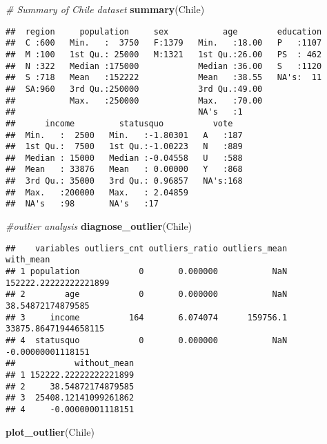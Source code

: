 \documentclass[]{article}
\newenvironment{Shaded}{\begin{snugshade}}{\end{snugshade}}
\newcommand{\CommentTok}[1]{\textcolor[rgb]{0.56,0.35,0.01}{\textit{#1}}}
\newcommand{\KeywordTok}[1]{\textcolor[rgb]{0.13,0.29,0.53}{\textbf{#1}}}
\newcommand{\NormalTok}[1]{#1}
\begin{document}
\begin{Shaded}
\begin{Highlighting}[]
\CommentTok{# Summary of Chile dataset}
\KeywordTok{summary}\NormalTok{(Chile)}
\end{Highlighting}
\end{Shaded}

\begin{verbatim}
##  region     population     sex           age        education  
##  C :600   Min.   :  3750   F:1379   Min.   :18.00   P   :1107  
##  M :100   1st Qu.: 25000   M:1321   1st Qu.:26.00   PS  : 462  
##  N :322   Median :175000            Median :36.00   S   :1120  
##  S :718   Mean   :152222            Mean   :38.55   NA's:  11  
##  SA:960   3rd Qu.:250000            3rd Qu.:49.00              
##           Max.   :250000            Max.   :70.00              
##                                     NA's   :1                  
##      income         statusquo          vote    
##  Min.   :  2500   Min.   :-1.80301   A   :187  
##  1st Qu.:  7500   1st Qu.:-1.00223   N   :889  
##  Median : 15000   Median :-0.04558   U   :588  
##  Mean   : 33876   Mean   : 0.00000   Y   :868  
##  3rd Qu.: 35000   3rd Qu.: 0.96857   NA's:168  
##  Max.   :200000   Max.   : 2.04859             
##  NA's   :98       NA's   :17
\end{verbatim}

\begin{Shaded}
\begin{Highlighting}[]
\CommentTok{#outlier analysis}
\KeywordTok{diagnose_outlier}\NormalTok{(Chile)}
\end{Highlighting}
\end{Shaded}

\begin{verbatim}
##    variables outliers_cnt outliers_ratio outliers_mean             with_mean
## 1 population            0       0.000000           NaN 152222.22222222221899
## 2        age            0       0.000000           NaN     38.54872174879585
## 3     income          164       6.074074      159756.1  33875.86471944658115
## 4  statusquo            0       0.000000           NaN     -0.00000001118151
##            without_mean
## 1 152222.22222222221899
## 2     38.54872174879585
## 3  25408.12141099261862
## 4     -0.00000001118151
\end{verbatim}

\begin{Shaded}
\begin{Highlighting}[]
\KeywordTok{plot_outlier}\NormalTok{(Chile)}
\end{Highlighting}
\end{Shaded}
\end{document}
